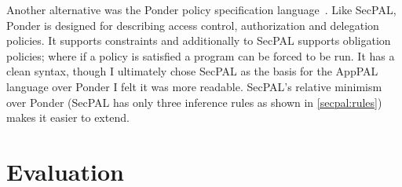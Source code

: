 \documentclass[thesis.tex]{subfiles}
\begin{document}
Another alternative was the Ponder policy specification language~\cite{damianou_ponder_2001}.
Like SecPAL, Ponder is designed for describing access control, authorization and delegation policies.
It supports constraints and additionally to SecPAL supports obligation policies; where if a policy is satisfied a program can be forced to be run.  It has a clean syntax, though 
I ultimately chose SecPAL as the basis for the AppPAL language over Ponder I felt it was more readable.
SecPAL's relative minimism over Ponder (SecPAL has only three inference rules as shown in \autoref{secpal:rules}) makes it easier to extend.


\section{Evaluation}
\end{document}
